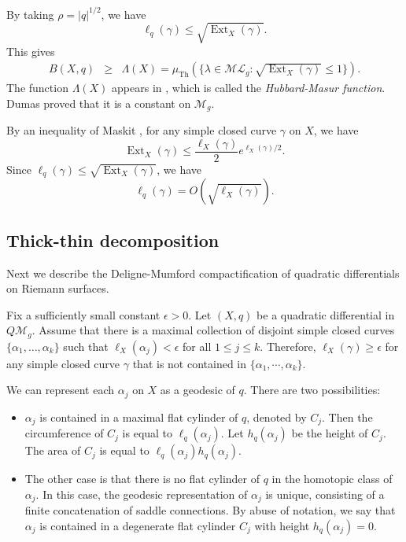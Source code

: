 \documentclass{amsart}
\theoremstyle{plain}
\theoremstyle{definition}
\numberwithin{equation}{section}
\newcommand{\ML}{\mathcal{ML}_g}
\newcommand{\Th}{\operatorname{Th}}
\begin{document}
By taking $\rho=|q|^{1/2}$, we have
$$\ell_q(\gamma) \leq \sqrt{\operatorname{Ext}_X(\gamma)}.$$
This gives
\begin{eqnarray*}
  B(X, q) &\geq &   \Lambda(X) = \mu_{\Th} \left(\{\lambda\in \ML :  \sqrt{\operatorname{Ext}_X(\gamma)} \leq 1\}\right).
\end{eqnarray*}
The function $\Lambda(X)$ appears in \cite{ABEM}, which is called the \textit{Hubbard-Masur function}.
Dumas \cite[Theorem 5.19]{Dumas} proved that it is a constant on $\mathcal{M}_g$. 





By an inequality of Maskit \cite{Maskit}, for any simple closed curve $\gamma$
on $X$, we have $$\operatorname{Ext}_X(\gamma) \leq \frac{\ell_X(\gamma)}{2}  e^{\ell_X(\gamma)/2}.$$ Since $\ell_{q}(\gamma) \leq \sqrt{\operatorname{Ext}_{X}(\gamma)}$, we have $$\ell_{q}(\gamma) =O\left( \sqrt{\ell_{X}(\gamma)} \right).$$



\subsection{Thick-thin decomposition}

Next we describe the Deligne-Mumford compactification of quadratic differentials on Riemann surfaces. 

Fix a sufficiently small constant $\epsilon>0$. 
Let $(X,q)$ be a quadratic differential in  $ Q\mathcal{M}_g$.
Assume that there is a maximal collection of disjoint simple closed curves 
$\{\alpha_1,\ldots,\alpha_k\}$ 
such that $\ell_{X}(\alpha_j) < \epsilon$ for all $1\leq j\leq k$. Therefore, $\ell_{X}(\gamma) \geq \epsilon$ for any simple closed curve $\gamma$
 that is not contained in $\{\alpha_1, \cdots, \alpha_k\}$. 


We can represent each $\alpha_j$ on $X$ as a geodesic of $q$. There are two possibilities: 
\begin{itemize}
\item[(i)]  $\alpha_j$ is contained in a maximal flat cylinder of $q$, denoted by
$C_j$. 
Then
the circumference of $C_{j}$ is equal to $\ell_{q}(\alpha_j)$. 
  Let $h_{q}(\alpha_j)$ be the height of $C_{j}$.  
  The area of $C_{j}$ is equal to 
  $ \ell_{q}(\alpha_j)h_{q}(\alpha_j).$
\item[(ii)] The other case is that there is no flat cylinder of $q$ in the homotopic class of $\alpha_j$. In this case, the geodesic representation of 
    $\alpha_j$ is unique, consisting of a finite concatenation of saddle connections. 
   By abuse of notation, 
we say that $\alpha_j$ is contained in a degenerate flat cylinder $C_{j}$ with height $h_{q}(\alpha_j)=0$.
\end{itemize}
\end{document}
